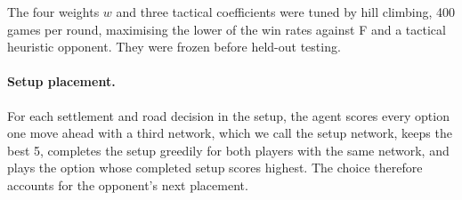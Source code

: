 \documentclass[11pt,a4paper]{article}
\begin{document}
\begin{table}[h]\centering\small
{}
\caption{Terms of $H$. $P$ is expected cards per roll and $p_r$ its share for resource $r$; $D$ counts distinct
resources. $b_0, b_1$ are the best spot production reachable now and after one road, $n_0, n_1$ their counts.
For each build goal $g$ with value $v_g$, $d_g$ is the number of missing cards and $t_g$ the number obtainable by
port trades. $N$ is hand size, $k$ played knights and $k^*$ the current army threshold.
$\phi = \max(0.3,\,1-0.12\max(0,\mathrm{VP}-4))$ moves weight from income to points late in the game.}
\label{tab:terms}
\end{table}

The four weights $w$ and three tactical coefficients were tuned by hill climbing, 400 games per round, maximising
the lower of the win rates against F and a tactical heuristic opponent. They were frozen before held-out testing.

\paragraph{Setup placement.} For each settlement and road decision in the setup, the agent scores every option one
move ahead with a third network, which we call the setup network, keeps the best 5, completes the setup greedily for both players
with the same network, and plays the option whose completed setup scores highest. The choice therefore accounts for
the opponent's next placement.
\end{document}
